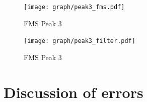 \begin{figure}[p]
	\centering
	\texttt{[image: graph/peak3\_fms.pdf]}
	\vspace{-2ex}
	\caption{FMS Peak 3}
	\label{fig:P3_fms}
	\vspace{2ex}

	\texttt{[image: graph/peak3\_filter.pdf]}
	\vspace{-2ex}
	\caption{FMS Peak 3}
	\label{fig:P3_filter}
	\vspace{-2em}
\end{figure}

\section{Discussion of errors}
